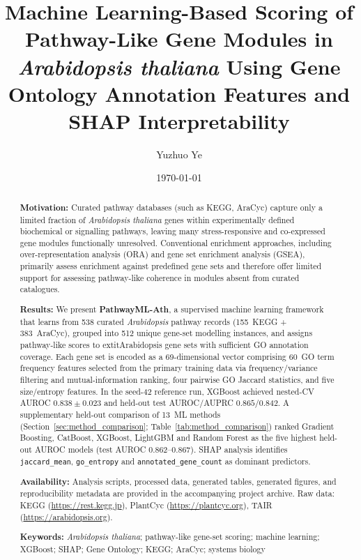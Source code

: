 \documentclass[12pt,twoside]{article}
\begin{document}
\title{\textbf{Machine Learning-Based Scoring of Pathway-Like Gene Modules
in \textit{Arabidopsis thaliana} Using Gene Ontology Annotation Features
and SHAP Interpretability}}

\author[1]{Yuzhuo Ye}
\date{\small \today}
\maketitle
\thispagestyle{empty}

\begin{abstract}
\noindent
\textbf{Motivation:}
Curated pathway databases (such as KEGG, AraCyc) capture only a limited fraction of \textit{Arabidopsis thaliana} genes within experimentally defined biochemical or signalling pathways, leaving many stress-responsive and co-expressed gene modules functionally unresolved. Conventional enrichment approaches, including over-representation analysis (ORA) and gene set enrichment analysis (GSEA), primarily assess enrichment against predefined gene sets and therefore offer limited support for assessing pathway-like coherence in modules absent from curated catalogues.

\noindent\textbf{Results:}
We present \textbf{PathwayML-Ath}, a supervised machine learning framework that
learns from 538 curated \textit{Arabidopsis} pathway records
(155~KEGG + 383~AraCyc), grouped into 512 unique gene-set modelling instances,
and assigns pathway-like scores to 	extit{Arabidopsis} gene sets with sufficient GO annotation coverage.
Each gene set is encoded as a 69-dimensional vector comprising 60~GO term frequency
features selected from the primary training data via frequency/variance filtering and mutual-information ranking,
four pairwise GO Jaccard statistics, and five size/entropy features. In the
seed-42 reference run, XGBoost achieved nested-CV AUROC $0.838 \pm 0.023$
and held-out test AUROC/AUPRC $0.865/0.842$. A supplementary held-out comparison of
13~ML methods (Section~\ref{sec:method_comparison}; Table~\ref{tab:method_comparison}) ranked
Gradient Boosting, CatBoost, XGBoost, LightGBM and Random Forest as the five highest held-out AUROC models
(test AUROC 0.862--0.867). SHAP analysis identifies
\texttt{jaccard\_mean}, \texttt{go\_entropy} and \texttt{annotated\_gene\_count} as dominant predictors.

\noindent\textbf{Availability:}
Analysis scripts, processed data, generated tables, generated figures, and reproducibility metadata are provided in the accompanying project archive.
Raw data: KEGG (\url{https://rest.kegg.jp}), PlantCyc (\url{https://plantcyc.org}),
TAIR (\url{https://arabidopsis.org}).

\noindent\textbf{Keywords:}
\textit{Arabidopsis thaliana}; pathway-like gene-set scoring; machine learning; XGBoost;
SHAP; Gene Ontology; KEGG; AraCyc; systems biology
\end{abstract}
\end{document}

